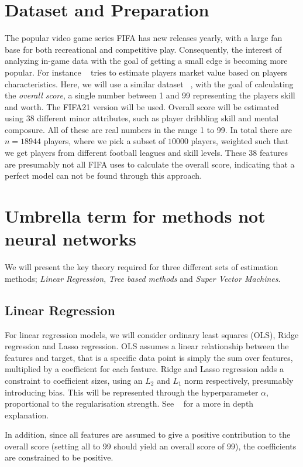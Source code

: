     \section{Dataset and Preparation}
        The popular video game series FIFA has new releases yearly, with a large fan base for both recreational and competitive play. Consequently, the interest of analyzing in-game data with the goal of getting a small edge is becoming more popular. For instance ~\citep{fifa21playersvalue} tries to estimate players market value based on players characteristics. Here, we will use a similar dataset ~\citep{fifa21_data}, with the goal of calculating the \textit{overall score}, a single number between 1 and 99 representing the players skill and worth. The FIFA21 version will be used. Overall score will be estimated using 38 different minor attributes, such as player dribbling skill and mental composure. All of these are real numbers in the range 1 to 99. In total there are $n = 18944$ players, where we pick a subset of $10000$ players, weighted such that we get players from different football leagues and skill levels. These 38 features are presumably not all FIFA uses to calculate the overall score, indicating that a perfect model can not be found through this approach. 
        
    \section{Umbrella term for methods not neural networks}
        We will present the key theory required for three different sets of estimation methods; \textit{Linear Regression}, \textit{Tree based methods} and \textit{Super Vector Machines}.
        \subsection{Linear Regression}
        For linear regression models, we will consider ordinary least squares (OLS), Ridge regression and Lasso regression. OLS assumes a linear relationship between the features and target, that is a specific data point is simply the sum over features, multiplied by a coefficient for each feature. Ridge and Lasso regression adds a constraint to coefficient sizes, using an $L_2$ and $L_1$ norm respectively, presumably introducing bias. This will be represented through the hyperparameter $\alpha$, proportional to the regularisation strength. See ~\citep{Project1} for a more in depth explanation.
            
        In addition, since all features are assumed to give a positive contribution to the overall score (setting all to 99 should yield an overall score of 99), the coefficients are constrained to be positive.  
        
